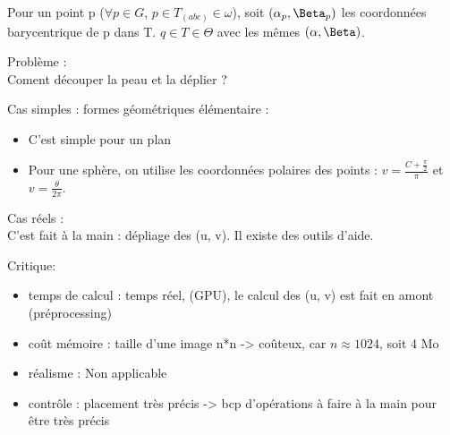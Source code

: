 \documentclass[11pt]{article}
\begin{document}
Pour un point p ($ \forall p \in G$, $p \in T_{(abc)} \in \omega$), soit $(\alpha _p, \Beta _p)$ les coordonnées barycentrique de p dans T. $q \in T \in \Theta$ avec les mêmes $(\alpha, \Beta)$.

Problème : \\
Coment découper la peau et la déplier ?

\vskip 1cm
Cas simples : formes géométriques élémentaire :\\
\begin{itemize}
	\item C'est simple pour un plan
	\item Pour une sphère, on utilise les coordonnées polaires des points : $v = \frac{C + \frac{\pi}{2}}{\pi}$ et $v = \frac{\theta}{2\pi}$.\\
\end{itemize}

\vskip 1cm
Cas réels : \\
C'est fait à la main : dépliage des (u, v). Il existe des outils d'aide.

Critique:\\
\begin{itemize}
	\item temps de calcul : temps réel, (GPU), le calcul des (u, v) est fait en amont (préprocessing)
	\item coût mémoire : taille d'une image n*n -> coûteux, car $n \approx 1024$, soit 4 Mo
	\item réalisme : Non applicable
	\item contrôle : placement très précis -> bcp d'opérations à faire à la main pour être très précis
\end{itemize}
\end{document}
